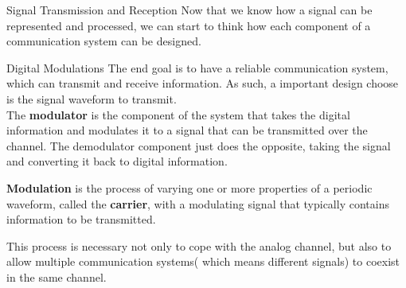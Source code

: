\begin{section}{Signal Transmission and Reception}
  Now that we know how a signal can be represented and processed, we can start to think how each 
  component of a communication system can be designed.\\
  \begin{subsection}{Digital Modulations}
    The end goal is to have a reliable communication system, which can transmit and receive
    information. As such, a important design choose is the signal waveform to transmit.\\
    The \textbf{modulator} is the component of the system that takes the digital information and 
    modulates it to a signal that can be transmitted over the channel. The demodulator component 
    just does the opposite, taking the signal and converting it back to digital information.\\

    \begin{boxH}
      \textbf{Modulation} is the process of varying one or more properties of a periodic waveform, called
      the \textbf{carrier}, with a modulating signal that typically contains information to be
      transmitted.
    \end{boxH}
    This process is necessary not only to cope with the analog channel, but also to allow multiple
    communication systems( which means different signals) to coexist in the same channel.\\


\end{subsection}
\end{section}

